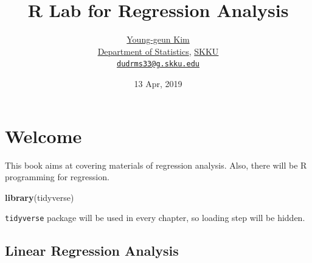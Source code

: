 \documentclass[]{book}
\title{R Lab for Regression Analysis}
\author{\href{https://github.com/ygeunkim}{Young-geun Kim}\\
\href{https://stat.skku.edu/stat/index.jsp}{Department of Statistics}, \href{https://www.skku.edu/skku/index.do}{SKKU}\\
\href{mailto:dudrms33@g.skku.edu}{\nolinkurl{dudrms33@g.skku.edu}}}
\date{13 Apr, 2019}
\newenvironment{Shaded}{\begin{snugshade}}{\end{snugshade}}
\newcommand{\DataTypeTok}[1]{\textcolor[rgb]{0.13,0.29,0.53}{#1}}
\newcommand{\KeywordTok}[1]{\textcolor[rgb]{0.13,0.29,0.53}{\textbf{#1}}}
\newcommand{\NormalTok}[1]{#1}
\newcommand{\OperatorTok}[1]{\textcolor[rgb]{0.81,0.36,0.00}{\textbf{#1}}}
\newcommand{\StringTok}[1]{\textcolor[rgb]{0.31,0.60,0.02}{#1}}
\let\oldmaketitle\maketitle
\theoremstyle{definition}
\theoremstyle{definition}
\theoremstyle{definition}
\theoremstyle{remark}
\begin{document}
\maketitle

\begin{titlepage}
  
\end{titlepage}

\let\maketitle\oldmaketitle
\maketitle

{
\setcounter{tocdepth}{1}
\tableofcontents
}
\hypertarget{welcome}{%
\chapter*{Welcome}\label{welcome}}

This book aims at covering materials of regression analysis. Also, there will be R programming for regression.

\begin{Shaded}
\begin{Highlighting}[]
\KeywordTok{library}\NormalTok{(tidyverse)}
\end{Highlighting}
\end{Shaded}

\texttt{tidyverse} package will be used in every chapter, so loading step will be hidden.

\hypertarget{linear-regression-analysis}{%
\section*{Linear Regression Analysis}\label{linear-regression-analysis}}

\begin{Shaded}
\end{Shaded}
\end{document}
